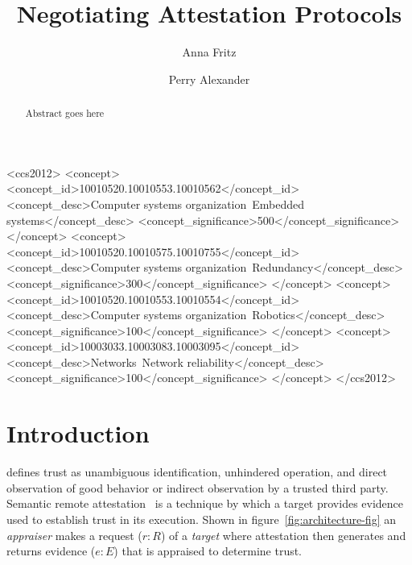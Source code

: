 \documentclass[sigconf,authordraft]{acmart}
\begin{document}
\title{Negotiating Attestation Protocols}

\author{Anna Fritz}  \author{Perry Alexander}
  

\renewcommand{\shortauthors}{Fritz and Alexander}

\begin{abstract}
  Abstract goes here
\end{abstract}

\begin{CCSXML}
  <ccs2012> <concept>
  <concept_id>10010520.10010553.10010562</concept_id>
  <concept_desc>Computer systems organization~Embedded
  systems</concept_desc>
  <concept_significance>500</concept_significance> </concept>
  <concept> <concept_id>10010520.10010575.10010755</concept_id>
  <concept_desc>Computer systems
  organization~Redundancy</concept_desc>
  <concept_significance>300</concept_significance> </concept>
  <concept> <concept_id>10010520.10010553.10010554</concept_id>
  <concept_desc>Computer systems organization~Robotics</concept_desc>
  <concept_significance>100</concept_significance> </concept>
  <concept> <concept_id>10003033.10003083.10003095</concept_id>
  <concept_desc>Networks~Network reliability</concept_desc>
  <concept_significance>100</concept_significance> </concept>
  </ccs2012>
\end{CCSXML}



\maketitle

\section{Introduction}

\citet{Martin:08:The-ten-page-in} defines trust as unambiguous
identification, unhindered operation, and direct observation of good
behavior or indirect observation by a trusted third party.  Semantic
remote attestation~\cite{Haldar:04:Semantic-Remote} is a technique by
which a target provides evidence used to establish trust in its
execution.  Shown in figure~\ref{fig:architecture-fig} an
\emph{appraiser} makes a request ($r:R$) of a \emph{target} where
attestation then generates and returns evidence ($e:E$) that is
appraised to determine trust.
\end{document}
